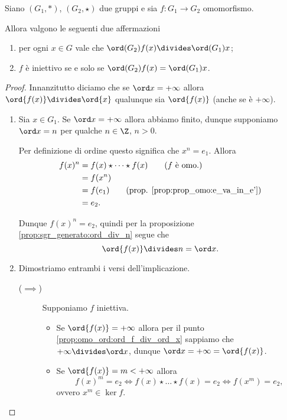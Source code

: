 \begin{proposition}
    \label{prop:omo_ord}
    Siano $(G_1, *)$, $(G_2, \star)$ due gruppi e sia $f : G_1 \to G_2$ omomorfismo.

    Allora valgono le seguenti due affermazioni \begin{enumerate}[label={(\roman*)}, ref={\theproposition: (\roman*)}]
        \item \label{prop:omo_ord:ord_f_div_ord_x} per ogni $x \in G$ vale che $\ord(G_2){f(x)} \divides \ord(G_1){x}$;
        \item \label{prop:omo_ord:inj_sse_ord_f=ord_x} $f$ è iniettivo se e solo se $\ord(G_2){f(x)} = \ord(G_1){x}$.
    \end{enumerate}
\end{proposition}
\begin{proof}
    Innanzitutto diciamo che se $\ord x = +\infty$ allora $\ord{f(x)} \divides \ord{x}$ qualunque sia $\ord{f(x)}$ (anche se è $+\infty$).

    \begin{enumerate}[label={(\roman*)}]
        \item Sia $x \in G_1$. Se $\ord x = +\infty$ allora abbiamo finito, dunque supponiamo $\ord x = n$ per qualche $n \in \Z$, $n > 0$.
        
        Per definizione di ordine questo significa che $x^n = e_1$.
        Allora \begin{align*}
            f(x)^n &= f(x) \star \cdots \star f(x) \tag{$f$ è omo.}\\
            &= f(x^n) \\
            &= f(e_1) \tag{prop. \ref{prop:prop_omo:e_va_in_e'}}\\
            &= e_2.
        \end{align*}

        Dunque $f(x)^n = e_2$, quindi per la proposizione \ref{prop:sgr_generato:ord_div_n} segue che \[
            \ord{f(x)} \divides n = \ord x.    
        \]
        \item Dimostriamo entrambi i versi dell'implicazione.
        \begin{description}
            \item[($\implies$)] Supponiamo $f$ iniettiva. \begin{itemize}
                \item Se $\ord{f(x)} = +\infty$ allora per il punto \ref{prop:omo_ord:ord_f_div_ord_x} sappiamo che $+\infty \divides \ord x$, dunque $\ord x = +\infty = \ord{f(x)}$.
                \item Se $\ord{f(x)} = m < +\infty$ allora \[
                    f(x)^m = e_2 \iff f(x) \star \dots \star f(x) = e_2 \iff f(x^m) = e_2,    
                \] ovvero $x^m \in \ker f$.


\end{itemize}
\end{description}
\end{enumerate}
\end{proof}
